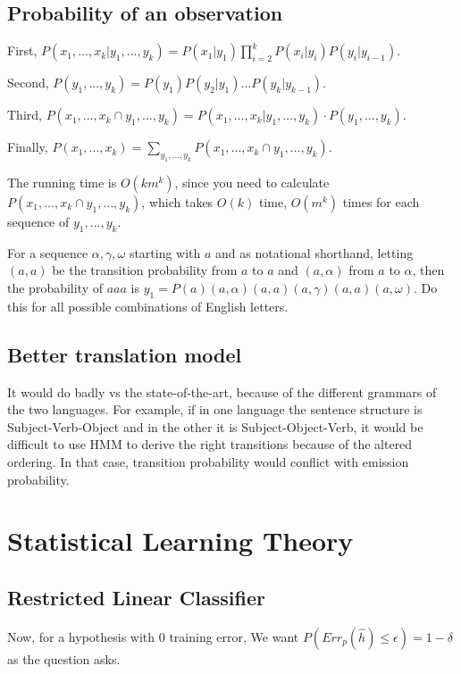 \documentclass[]{article}
\begin{document}
\subsection{Probability of an observation}

First, $P(x_1,...,x_k|y_1,...,y_k) = P(x_1|y_1) \prod_{i=2}^k P(x_i|y_i)P(y_i|y_{i-1})$.

Second, $P(y_1,...,y_k) = P(y_1)P(y_2|y_1)...P(y_k|y_{k-1})$.

Third, $P(x_1,...,x_k \cap y_1,...,y_k) = P(x_1,...,x_k|y_1,...,y_k) \cdot P(y_1,...,y_k)$.

Finally, $P(x_1,...,x_k) = \sum_{y_1,...,y_k} P(x_1,...,x_k \cap y_1,...,y_k)$.

The running time is $O(km^k)$, since you need to calculate $P(x_1,...,x_k \cap y_1,...,y_k)$, which takes $O(k)$ time, $O(m^k)$ times for each sequence of $y_1,...,y_k$.

For a sequence $\alpha, \gamma, \omega$ starting with $a$ and as notational shorthand, letting $(a,a)$ be the transition probability from $a$ to $a$ and $(a,\alpha)$ from $a$ to $\alpha$, then the probability of $aaa$ is $y_1 = P(a)(a,\alpha)(a,a)(a,\gamma)(a,a)(a,\omega)$. Do this for all possible combinations of English letters.

\subsection{Better translation model}

It would do badly vs the state-of-the-art, because of the different grammars of the two languages. For example, if in one language the sentence structure is Subject-Verb-Object and in the other it is Subject-Object-Verb, it would be difficult to use HMM to derive the right transitions because of the altered ordering. In that case, transition probability would conflict with emission probability.

\section{Statistical Learning Theory}

\subsection{Restricted Linear Classifier}

Now, for a hypothesis with 0 training error, We want $P(Err_p(\hat h) \le \epsilon) = 1- \delta$ as the question asks.
\end{document}
